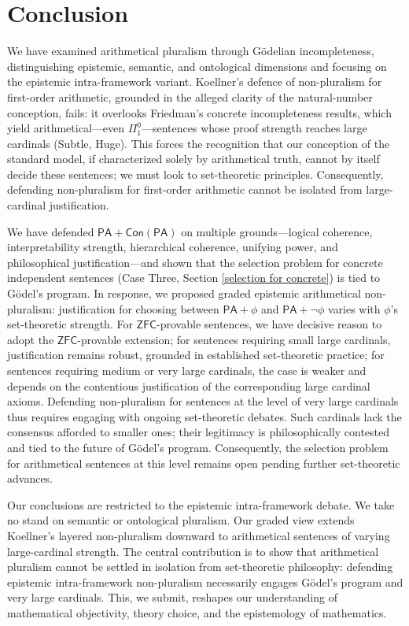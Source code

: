 \documentclass[a4paper,12pt]{amsart}
\theoremstyle{definition}
\numberwithin{equation}{section}
\begin{document}
\section{Conclusion}\label{conclusion} 
We have examined arithmetical pluralism through G\"odelian incompleteness, distinguishing epistemic, semantic, and ontological dimensions and focusing on the epistemic intra-framework variant. Koellner's defence of non-pluralism for first-order arithmetic, grounded in the alleged clarity of the natural-number conception, fails: it overlooks Friedman's concrete incompleteness results, which yield arithmetical---even \(\Pi_1^0\)---sentences whose proof strength reaches large cardinals (Subtle, Huge). This forces the recognition that our conception of the standard model, if characterized solely by arithmetical truth, cannot by itself decide these sentences; we must look to set-theoretic principles. Consequently, defending non-pluralism for first-order arithmetic cannot be isolated from large-cardinal justification.


We have defended \(\mathsf{PA} + \mathsf{Con}(\mathsf{PA})\) on multiple grounds---logical coherence, interpretability strength, hierarchical coherence, unifying power, and philosophical justification---and shown that the selection problem for concrete independent sentences (Case Three, Section \ref{selection for concrete}) is tied to G\"odel's program. In response, we proposed graded epistemic arithmetical non-pluralism: justification for choosing between \(\mathsf{PA} + \phi\) and \(\mathsf{PA} + \neg \phi\) varies with \(\phi\)'s set-theoretic strength. For \(\mathsf{ZFC}\)-provable sentences, we have decisive reason to adopt the \(\mathsf{ZFC}\)-provable extension; for sentences requiring small large cardinals, justification remains robust, grounded in established set-theoretic practice; for sentences requiring medium or very large cardinals, the case is weaker and depends on the contentious justification of the corresponding large cardinal axioms. Defending non-pluralism for sentences at the level of very large cardinals thus requires engaging with ongoing set-theoretic debates. Such cardinals lack the consensus afforded to smaller ones; their legitimacy is philosophically contested and tied to the future of Gödel's program. Consequently, the selection problem for arithmetical sentences at this level remains open pending further set-theoretic advances.

Our conclusions are restricted to the epistemic intra-framework debate. We take no stand on semantic or ontological pluralism. Our graded view extends Koellner's layered non-pluralism downward to arithmetical sentences of varying large-cardinal strength. The central contribution is to show that arithmetical pluralism cannot be settled in isolation from set-theoretic philosophy: defending epistemic intra-framework non-pluralism necessarily engages G\"odel's program and very large cardinals. This, we submit, reshapes our understanding of mathematical objectivity, theory choice, and the epistemology of mathematics.
\end{document}

